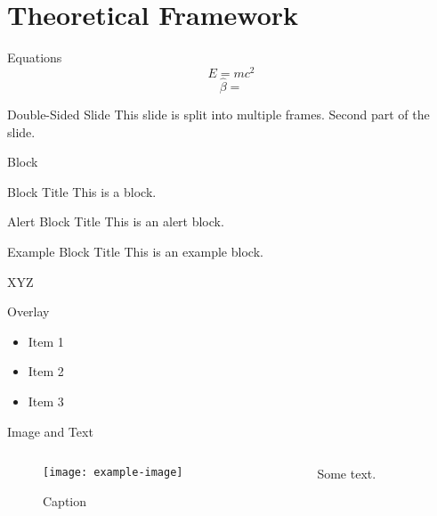 \section{Theoretical Framework} 

\begin{frame}{Equations}
\[
E=mc^2
\]
\begin{equation}
\hat{\beta} = 
\end{equation}
\end{frame}

\begin{frame}[allowframebreaks]{Double-Sided Slide}
This slide is split into multiple frames.
\framebreak
Second part of the slide.
\end{frame}

\begin{frame}{Block}
\begin{block}{Block Title}
This is a block.
\end{block}
\begin{alertblock}{Alert Block Title}
This is an alert block.
\end{alertblock}
\begin{exampleblock}{Example Block Title}
This is an example block.
\end{exampleblock}
\end{frame}

\begin{frame}
\begin{Theorem}
XYZ 
\end{Theorem}
\end{frame}

\begin{frame}{Overlay}
\begin{itemize}
\item<1-> Item 1
\item<2-> Item 2
\item<3-> Item 3
\end{itemize}
\end{frame}

\begin{frame}{Image and Text}
\begin{columns}
\begin{column}{0.4 \textwidth}
\begin{figure}
\texttt{[image: example-image]}
\caption{Caption}
\end{figure}
\end{column}
\begin{column}{0.4\textwidth}
Some text.
\end{column}
\end{columns}
\end{frame}


